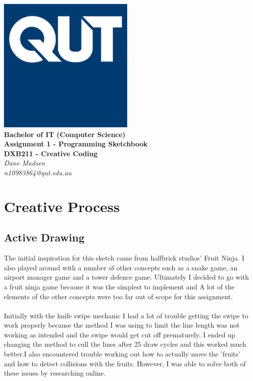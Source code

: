 \documentclass[12pt,a4paper]{article}
\begin{document}
	\begin{titlepage}
		\begin{center}
			\includegraphics[width=0.5\textwidth]{QUT.jpg}\\
			[0.03\textheight]  
			\Large\textbf{Bachelor of IT (Computer Science)}\\
			\Large\textbf{Assignment 1 - Programming Sketchbook}\\
			\large\textbf{DXB211 - Creative Coding}\\
			[0.02\textheight]
			\large\textsl{Dane Madsen}\\
			\large\textsl{n10983864@qut.edu.au}
		\end{center}
		
	\end{titlepage}

	\section{Creative Process}
		\subsection{Active Drawing}
			The initial inspiration for this sketch came from halfbrick studios' Fruit Ninja.
			I also played around with a number of other concepts such as a snake game, an airport 
			manager game and a tower defence game. Ultimately I decided to go with a fruit ninja 
			game because it was the simplest to implement and A lot of the elements of the other 
			concepts were too far out of scope for this assignment.\\\\Initially with the knife 
			swipe mechanic I had a lot of trouble getting the swipe to work properly because the 
			method I was using to limit the line length was not working as intended and the swipe 
			would get cut off prematurely. I ended up changing the method to cull the lines after 
			25 draw cycles and this worked much better.I also encountered trouble working out 
			how to actually move the 'fruits' and how to detect collisions with the fruits. However, 
			I was able to solve both of these issues by researching online.\\
\end{document}
